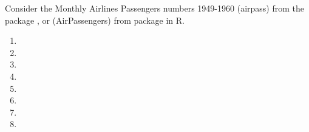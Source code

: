 Consider the Monthly Airlines Passengers numbers 1949-1960 (airpass) from the package , or (AirPassengers) from package  in R.

\begin{enumerate}[label=(\alph*)]
    \item 
    \item 
    \item 
    \item 
    \item 
    \item 
    \item 
    \item 
\end{enumerate}